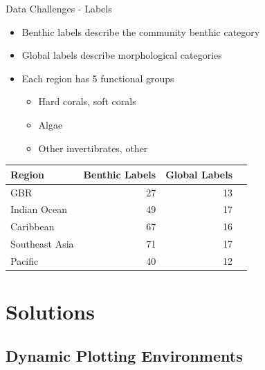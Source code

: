 \documentclass{beamer}
\begin{document}
            \begin{frame}{Data Challenges - Labels}
                \begin{itemize}
                  \item Benthic labels describe the community benthic category
                  \item Global labels describe morphological categories
                  \item Each region has 5 functional groups
                  \begin{itemize}
                    \item Hard corals, soft corals
                    \item Algae
                    \item Other invertibrates, other
                  \end{itemize}
                \end{itemize}

              \begin{center}
                  \begin{table}
                      \begin{tabular}{l r r r}
                          Region                &   Benthic Labels         &   Global Labels   \\ \hline
                          GBR                   &   27                     &   13              \\
                          Indian Ocean          &   49                     &   17              \\
                          Caribbean             &   67                     &   16              \\
                          Southeast Asia        &   71                     &   17              \\
                          Pacific               &   40                     &   12              \\
                      \end{tabular}
                  \end{table}
              \end{center}
            \end{frame}

      \section{Solutions}
          \subsection{Dynamic Plotting Environments}
\end{document}
